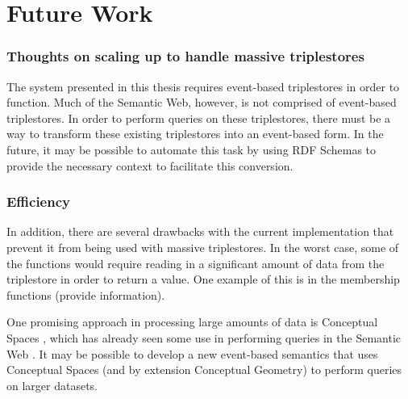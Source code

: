 \documentclass[../main.tex]{subfiles}
\begin{document}
	
\chapter{Future Work}

\subsection*{Thoughts on scaling up to handle massive triplestores}

The system presented in this thesis requires event-based triplestores in order to function.  Much of the Semantic Web, however, is not comprised of event-based triplestores.  In order to perform queries on these triplestores, there must be a way to transform these existing triplestores into an event-based form.  In the future, it may be possible to automate this task by using RDF Schemas\cite{owl}  to provide the necessary context to facilitate this conversion.

\subsection*{Efficiency}

In addition, there are several drawbacks with the current implementation that prevent it from being used with massive triplestores.  In the worst case, some of the functions would require reading in a significant amount of data from the triplestore in order to return a value.  One example of this is in the membership functions (provide information).

One promising approach in processing large amounts of data is Conceptual Spaces \cite{cs}, which has already seen some use in performing queries in the Semantic Web \cite{usesofcs}.  It may be possible to develop a new event-based semantics that uses Conceptual Spaces (and by extension Conceptual Geometry) to perform queries on larger datasets.
\end{document}
